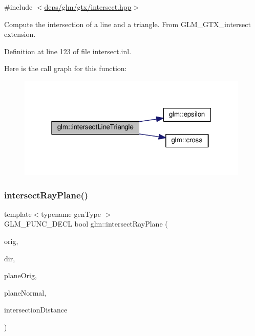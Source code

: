 {\ttfamily \#include $<$\hyperlink{intersect_8hpp}{deps/glm/gtx/intersect.\+hpp}$>$}

Compute the intersection of a line and a triangle. From G\+L\+M\+\_\+\+G\+T\+X\+\_\+intersect extension. 

Definition at line 123 of file intersect.\+inl.

Here is the call graph for this function\+:
\nopagebreak
\begin{figure}[H]
\begin{center}
\leavevmode
\includegraphics[width=313pt]{df/d2a/group__gtx__intersect_ga9d29b9b3acb504d43986502f42740df4_cgraph}
\end{center}
\end{figure}
\mbox{\label{group__gtx__intersect_gad3697a9700ea379739a667ea02573488}} 
\subsubsection{\texorpdfstring{intersect\+Ray\+Plane()}{intersectRayPlane()}}
{\footnotesize\ttfamily template$<$typename gen\+Type $>$ \\
G\+L\+M\+\_\+\+F\+U\+N\+C\+\_\+\+D\+E\+CL bool glm\+::intersect\+Ray\+Plane (\begin{DoxyParamCaption}\item[{gen\+Type const \&}]{orig,  }\item[{gen\+Type const \&}]{dir,  }\item[{gen\+Type const \&}]{plane\+Orig,  }\item[{gen\+Type const \&}]{plane\+Normal,  }\item[{typename gen\+Type\+::value\+\_\+type \&}]{intersection\+Distance }\end{DoxyParamCaption})}



